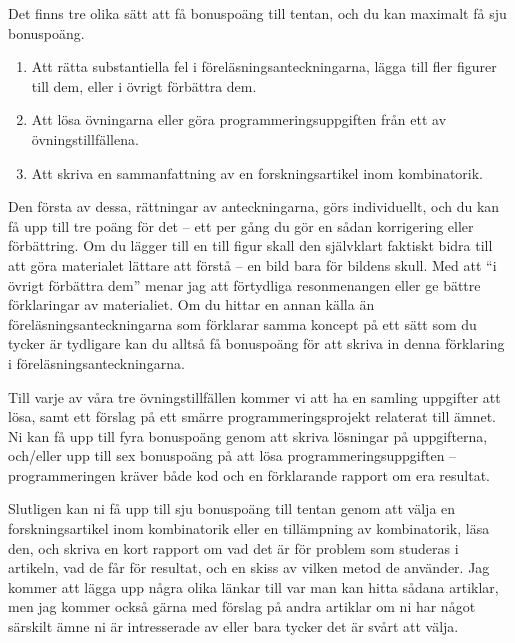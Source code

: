 \documentclass{tufte-handout}
\begin{document}
Det finns tre olika sätt att få bonuspoäng till tentan, och du kan maximalt få sju bonuspoäng.

\begin{enumerate}
	\item Att rätta substantiella fel i föreläsningsanteckningarna, lägga till fler figurer till dem, eller i övrigt förbättra dem.
	\item Att lösa övningarna eller göra programmeringsuppgiften från ett av övningstillfällena.
	\item Att skriva en sammanfattning av en forskningsartikel inom kombinatorik.
\end{enumerate}

Den första av dessa, rättningar av anteckningarna, görs individuellt, och du kan få upp till tre poäng för det -- ett per gång du gör en sådan korrigering eller förbättring. Om du lägger till en till figur skall den självklart faktiskt bidra till att göra materialet lättare att förstå -- en bild bara för bildens skull. Med att ``i övrigt förbättra dem'' menar jag att förtydliga resonmenangen eller ge bättre förklaringar av materialiet. Om du hittar en annan källa än föreläsningsanteckningarna som förklarar samma koncept på ett sätt som du tycker är tydligare kan du alltså få bonuspoäng för att skriva in denna förklaring i föreläsningsanteckningarna.

Till varje av våra tre övningstillfällen kommer vi att ha en samling uppgifter att lösa, samt ett förslag på ett smärre programmeringsprojekt relaterat till ämnet. Ni kan få upp till fyra bonuspoäng genom att skriva lösningar på uppgifterna, och/eller upp till sex bonuspoäng på att lösa programmeringsuppgiften -- programmeringen kräver både kod och en förklarande rapport om era resultat.

Slutligen kan ni få upp till sju bonuspoäng till tentan genom att välja en forskningsartikel inom kombinatorik eller en tillämpning av kombinatorik, läsa den, och skriva en kort rapport om vad det är för problem som studeras i artikeln, vad de får för resultat, och en skiss av vilken metod de använder. Jag kommer att lägga upp några olika länkar till var man kan hitta sådana artiklar, men jag kommer också gärna med förslag på andra artiklar om ni har något särskilt ämne ni är intresserade av eller bara tycker det är svårt att välja.
\end{document}
